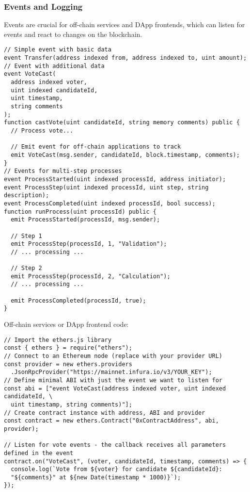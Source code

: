 \documentclass[12pt]{article}
\begin{document}
\subsubsection*{Events and Logging}
Events are crucial for off-chain services and DApp frontends, which can listen for events and react to changes on the blockchain.

\noindent
\begin{minipage}[c]{\textwidth}
  \begin{lstlisting}[language=Solidity]
// Simple event with basic data
event Transfer(address indexed from, address indexed to, uint amount);
// Event with additional data
event VoteCast(
  address indexed voter,
  uint indexed candidateId,
  uint timestamp,
  string comments
);
function castVote(uint candidateId, string memory comments) public {
  // Process vote...
  
  // Emit event for off-chain applications to track
  emit VoteCast(msg.sender, candidateId, block.timestamp, comments);
}
// Events for multi-step processes
event ProcessStarted(uint indexed processId, address initiator);
event ProcessStep(uint indexed processId, uint step, string description);
event ProcessCompleted(uint indexed processId, bool success);
function runProcess(uint processId) public {
  emit ProcessStarted(processId, msg.sender);
  
  // Step 1
  emit ProcessStep(processId, 1, "Validation");
  // ... processing ...

  // Step 2
  emit ProcessStep(processId, 2, "Calculation");
  // ... processing ...

  emit ProcessCompleted(processId, true);
}
\end{lstlisting}
\end{minipage}

\medskip
\noindent
Off-chain services or DApp frontend code:

\noindent
\begin{minipage}[c]{\textwidth}
  \begin{verbatim}
// Import the ethers.js library
const { ethers } = require("ethers");
// Connect to an Ethereum node (replace with your provider URL)
const provider = new ethers.providers
  .JsonRpcProvider("https://mainnet.infura.io/v3/YOUR_KEY");
// Define minimal ABI with just the event we want to listen for
const abi = ["event VoteCast(address indexed voter, uint indexed candidateId, \
  uint timestamp, string comments)"];
// Create contract instance with address, ABI and provider
const contract = new ethers.Contract("0xContractAddress", abi, provider);

// Listen for vote events - the callback receives all parameters defined in the event
contract.on("VoteCast", (voter, candidateId, timestamp, comments) => {
  console.log(`Vote from ${voter} for candidate ${candidateId}: 
  "${comments}" at ${new Date(timestamp * 1000)}`);
});
  \end{verbatim}
\end{minipage}
\end{document}
